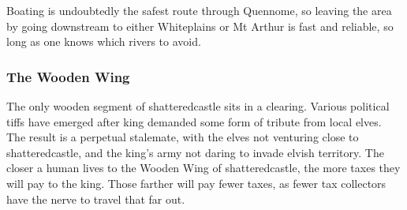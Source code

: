 \begin{multicols}{2}
Boating is undoubtedly the safest route through Quennome, so leaving the area by going downstream to either Whiteplains or Mt Arthur is fast and reliable, so long as one knows which rivers to avoid.

\subsubsection{The Wooden Wing}

The only wooden segment of \gls{shatteredcastle} sits in a clearing.
Various political tiffs have emerged after \gls{king} demanded some form of tribute from local elves.
The result is a perpetual stalemate, with the elves not venturing close to \gls{shatteredcastle}, and the king's army not daring to invade elvish territory.
The closer a human lives to the Wooden Wing of \gls{shatteredcastle}, the more taxes they will pay to the king.
Those farther will pay fewer taxes, as fewer tax collectors have the nerve to travel that far out.

\iftoggle{players}{}{

\subsubsection{Seasonal Encounters}

\paragraph{Cold} seasons bring stormy weather and wolves.
Each day of travel inflicts an additional 3 Fatigue Points, and when this encounter is rolled, the PCs are followed by $3D6$ wolves.

\paragraph{Mild} seasons are relatively safe.
Have the party encounter a wandering bear.

\paragraph{Stormy} weather can flood places, meaning the rivers become dangerous to navigate by boat, and once-dry land can become a temporary swamp.
Anyone in a boat rolls Wits + Seafaring, TN 9, or capsizes or otherwise loses control of the vessel.
Those wandering the forests get the choice of climbing a tree and hoping the waters subside soon, or wading through dank sludge.

}
\end{multicols}

